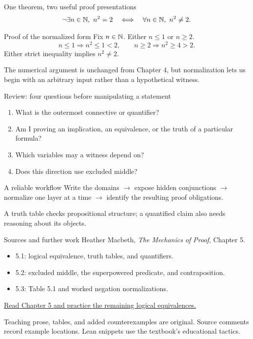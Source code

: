 \begin{frame}{One theorem, two useful proof presentations}
\[
\neg\exists n\in\mathbb{N},\ n^2=2
\quad\Longleftrightarrow\quad
\forall n\in\mathbb{N},\ n^2\ne2.
\]
\begin{block}{Proof of the normalized form}
Fix $n\in\mathbb{N}$. Either $n\le1$ or $n\ge2$.
\[
n\le1\Rightarrow n^2\le1<2,
\qquad
n\ge2\Rightarrow n^2\ge4>2.
\]
Either strict inequality implies $n^2\ne2$.
\end{block}
The numerical argument is unchanged from Chapter 4, but normalization lets us begin with an arbitrary input rather than a hypothetical witness.
\end{frame}

\begin{frame}{Review: four questions before manipulating a statement}
\begin{enumerate}
\item What is the outermost connective or quantifier?
\item Am I proving an implication, an equivalence, or the truth of a particular formula?
\item Which variables may a witness depend on?
\item Does this direction use excluded middle?
\end{enumerate}
\begin{block}{A reliable workflow}
Write the domains $\longrightarrow$ expose hidden conjunctions $\longrightarrow$ normalize one layer at a time $\longrightarrow$ identify the resulting proof obligations.
\end{block}
A truth table checks propositional structure; a quantified claim also needs reasoning about its objects.
\end{frame}

\begin{frame}{Sources and further work}
Heather Macbeth, \emph{The Mechanics of Proof}, Chapter 5.
\begin{itemize}
\item 5.1: logical equivalence, truth tables, and quantifiers.
\item 5.2: excluded middle, the superpowered predicate, and contraposition.
\item 5.3: Table 5.1 and worked negation normalizations.
\end{itemize}
\medskip
\href{https://hrmacbeth.github.io/math2001/05_Logic.html}{Read Chapter 5 and practice the remaining logical equivalences.}
\medskip

Teaching prose, tables, and added counterexamples are original. Source comments record example locations. Lean snippets use the textbook's educational tactics.
\end{frame}

